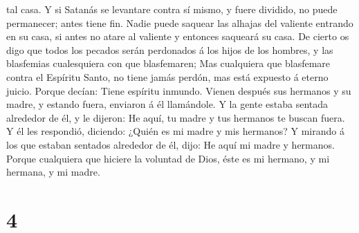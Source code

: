 tal casa.  Y si Satanás se levantare contra sí mismo, y
fuere dividido, no puede permanecer; antes tiene fin. 
Nadie puede saquear las alhajas del valiente entrando en su casa, si
antes no atare al valiente y entonces saqueará su casa.  De
cierto os digo que todos los pecados serán perdonados á los hijos de los
hombres, y las blasfemias cualesquiera con que blasfemaren;
 Mas cualquiera que blasfemare contra el Espíritu Santo, no
tiene jamás perdón, mas está expuesto á eterno juicio. 
Porque decían: Tiene espíritu inmundo.  Vienen después sus
hermanos y su madre, y estando fuera, enviaron á él llamándole.
 Y la gente estaba sentada alrededor de él, y le dijeron:
He aquí, tu madre y tus hermanos te buscan fuera.  Y él les
respondió, diciendo: ¿Quién es mi madre y mis hermanos?  Y
mirando á los que estaban sentados alrededor de él, dijo: He aquí mi
madre y hermanos.  Porque cualquiera que hiciere la
voluntad de Dios, éste es mi hermano, y mi hermana, y mi madre.

\hypertarget{section-3}{%
\section{4}\label{section-3}}

